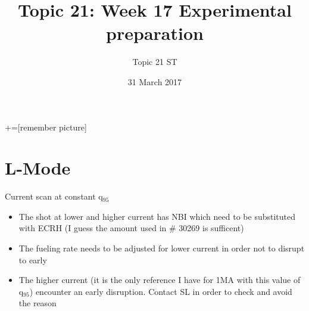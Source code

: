 \documentclass[10pt, compress]{beamer}
\title{Topic 21: Week 17 Experimental preparation}
\date{31 March 2017}
\author[Topic 21]{Topic 21 ST}
\newcommand\Fontvi{\fontsize{8}{7.2}\selectfont}
\begin{document}
+=[remember picture]
\maketitle
\section{L-Mode}
\begin{frame}{Current scan at constant q$_{95}$}
  \vspace{-1cm}
  \Fontvi
  \begin{itemize}
    \item The shot at lower and higher current has NBI which need to
      be substituted with ECRH (I guess the amount used in \# 30269 is
      sufficent)
    \item The fueling rate needs to be adjusted for lower current in
      order not to disrupt to early
    \item The higher current (it is the only reference I have for 1MA
      with this value of q$_{95}$) encounter an early
      disruption. \alert{Contact SL in order to check and avoid the reason}
  \end{itemize}    
\end{frame}
\end{document}
